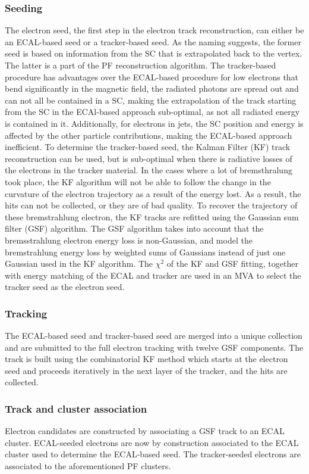 \subsubsection*{Seeding}
\noindent\justify
The electron seed, the first step in the electron track reconstruction, can either be an ECAL-based seed or a tracker-based seed. 
As the naming suggests, the former seed is based on information from the SC that is extrapolated back to the vertex. 
The latter is a part of the PF reconstruction algorithm. 
The tracker-based procedure has advantages over the ECAL-based procedure for low \pt electrons that bend significantly in the magnetic field, the radiated photons are spread out and can not all be contained in a SC, making the extrapolation of the track starting from the SC in the ECAl-based approach sub-optimal, as not all radiated energy is contained in it. 
Additionally, for electrons in jets, the SC position and energy is affected by the other particle contributions, making the ECAL-based approach inefficient. 
To determine the tracker-based seed, the Kalman Filter (KF) track reconstruction can be used, but is sub-optimal when there is radiative losses of the electrons in the tracker material. 
In the cases where a lot of bremsthralung took place, the KF algorithm will not be able to follow the change in the curvature of the electron trajectory as a result of the energy lost. 
As a result, the hits can not be collected, or they are of bad quality. 
To recover the trajectory of these bremstrahlung electron, the KF tracks are refitted using the Gaussian sum filter (GSF) algorithm.
The GSF algorithm takes into account that the bremsstrahlung electron energy loss is non-Gaussian, and model the bremstrahlung energy loss by weighted sums of Gaussians instead of just one Gaussian used in the KF algorithm. 
The $\chi^{2}$ of the KF and GSF fitting, together with energy matching of the ECAL and tracker are used in an MVA to select the tracker seed as the electron seed. 
\subsubsection*{Tracking}
\noindent\justify
The ECAL-based seed and tracker-based seed are merged into a unique collection and are submitted to the full electron tracking with twelve GSF components.
The track is built using the combinatorial KF method which starts at the electron seed and proceeds iteratively in the next layer of the tracker, and the hits are collected.
\subsubsection*{Track and cluster association}
\noindent\justify
Electron candidates are constructed by associating a GSF track to an ECAL cluster. 
ECAL-seeded electrons are now by construction associated to the ECAL cluster used to determine the ECAL-based seed. 
The tracker-seeded electrons are associated to the aforementioned PF clusters.   
